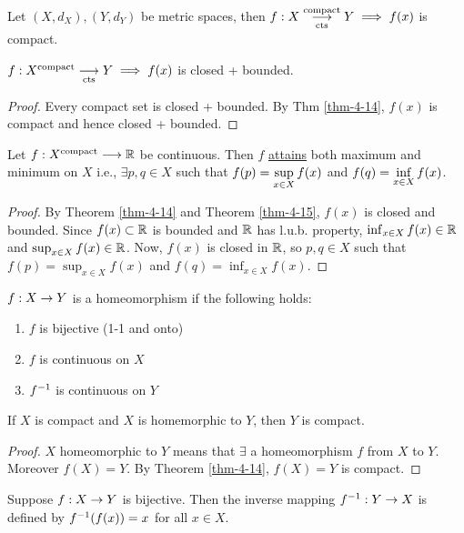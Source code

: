 \documentclass[]{article}
\begin{document}
\begin{recall}
	 Let $(X,d_X),(Y,d_Y)$ be metric spaces, then $f:X\underset{\text{cts}}{\overset{\text{compact}}{\longrightarrow}} Y \implies f(x)$ is compact.
\end{recall}
\begin{theorem}
	\label{thm-4-15}
	$f:X^\text{compact}\underset{\text{cts}}{\longrightarrow} Y \implies f(x)$ is closed + bounded.
\end{theorem}
\begin{proof}
	Every compact set is closed + bounded. By Thm \ref{thm-4-14}, $f(x)$ is compact and hence closed + bounded.
\end{proof}
\begin{theorem}
	Let $f:X^\text{compact} \longrightarrow \mathbb{R}$ be continuous.
	Then $f$ \ul{attains} both maximum and minimum on $X$ i.e., $\exists p,q\in X$ such that $\displaystyle f(p)=\sup_{x\in X} f(x)$ and $\displaystyle f(q) = \inf_{x\in X} f(x)$.
\end{theorem}
\begin{proof}
	By Theorem \ref{thm-4-14} and Theorem \ref{thm-4-15}, $f(x)$ is closed and bounded.
	Since $f(x)\subset\mathbb{R}$ is bounded and $\mathbb{R}$ has l.u.b. property, $\inf_{x\in X} f(x)\in\mathbb{R}$ and $\sup_{x\in X}f(x)\in\mathbb{R}$.
	Now, $f(x)$ is closed in $\mathbb{R}$, so $p,q\in X$ such that $f(p) = \sup_{x\in X}f(x)$ and $f(q) = \inf_{x\in X}f(x)$.
\end{proof}

\begin{definition}
	[Homeomorphism] $f:X\rightarrow Y$ is a homeomorphism if the following holds:
	\begin{enumerate}
		\item $f$ is bijective (1-1 and onto)
		\item $f$ is continuous on $X$
		\item $f^{-1}$ is continuous on $Y$
	\end{enumerate}
\end{definition}

\begin{theorem}
	If $X$ is compact and $X$ is homemorphic to $Y$, then $Y$ is compact.
\end{theorem}
\begin{proof}
	$X$ homeomorphic to $Y$ means that $\exists$ a homeomorphism $f$ from $X$ to $Y$.
	Moreover $f(X) = Y$. By Theorem \ref{thm-4-14}, $f(X)=Y$ is compact.
\end{proof}

\begin{definition}
	 Suppose $f:X\rightarrow Y$ is bijective. Then the inverse mapping $f^{-1}:Y\rightarrow X$ is defined by $f^{-1}(f(x)) = x$ for all $x\in X$.
\end{definition}
\end{document}
